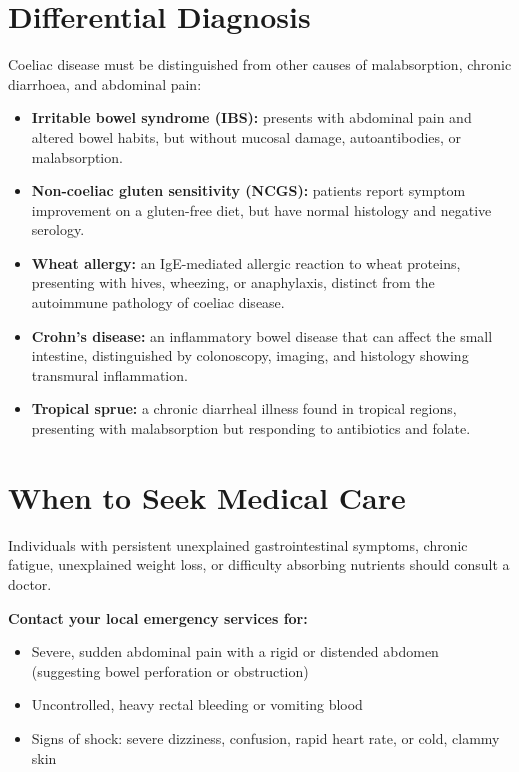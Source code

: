 \section*{Differential Diagnosis}
Coeliac disease must be distinguished from other causes of malabsorption, chronic diarrhoea, and abdominal pain:

\begin{itemize}
    \item \textbf{Irritable bowel syndrome (IBS):} presents with abdominal pain and altered bowel habits, but without mucosal damage, autoantibodies, or malabsorption.
    \item \textbf{Non-coeliac gluten sensitivity (NCGS):} patients report symptom improvement on a gluten-free diet, but have normal histology and negative serology.
    \item \textbf{Wheat allergy:} an IgE-mediated allergic reaction to wheat proteins, presenting with hives, wheezing, or anaphylaxis, distinct from the autoimmune pathology of coeliac disease.
    \item \textbf{Crohn's disease:} an inflammatory bowel disease that can affect the small intestine, distinguished by colonoscopy, imaging, and histology showing transmural inflammation.
    \item \textbf{Tropical sprue:} a chronic diarrheal illness found in tropical regions, presenting with malabsorption but responding to antibiotics and folate.
\end{itemize}

\section*{When to Seek Medical Care}
Individuals with persistent unexplained gastrointestinal symptoms, chronic fatigue, unexplained weight loss, or difficulty absorbing nutrients should consult a doctor.

\textbf{Contact your local emergency services for:}
\begin{itemize}
    \item Severe, sudden abdominal pain with a rigid or distended abdomen (suggesting bowel perforation or obstruction)
    \item Uncontrolled, heavy rectal bleeding or vomiting blood
    \item Signs of shock: severe dizziness, confusion, rapid heart rate, or cold, clammy skin
\end{itemize}

